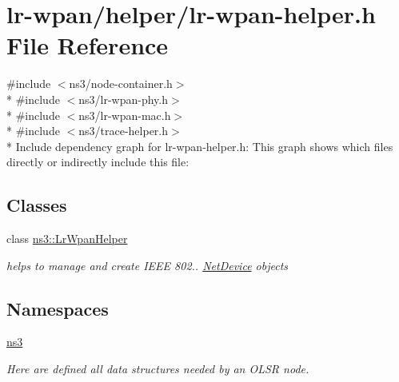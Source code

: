\hypertarget{lr-wpan-helper_8h}{}\section{lr-\/wpan/helper/lr-\/wpan-\/helper.h File Reference}
\label{lr-wpan-helper_8h}
{\ttfamily \#include $<$ns3/node-\/container.\+h$>$}\\*
{\ttfamily \#include $<$ns3/lr-\/wpan-\/phy.\+h$>$}\\*
{\ttfamily \#include $<$ns3/lr-\/wpan-\/mac.\+h$>$}\\*
{\ttfamily \#include $<$ns3/trace-\/helper.\+h$>$}\\*
Include dependency graph for lr-\/wpan-\/helper.h\+:
This graph shows which files directly or indirectly include this file\+:
\subsection*{Classes}
\begin{DoxyCompactItemize}
\item 
class \hyperlink{classns3_1_1LrWpanHelper}{ns3\+::\+Lr\+Wpan\+Helper}
\begin{DoxyCompactList}\small\item\em helps to manage and create I\+E\+EE 802.. \hyperlink{classns3_1_1NetDevice}{Net\+Device} objects \end{DoxyCompactList}\end{DoxyCompactItemize}
\subsection*{Namespaces}
\begin{DoxyCompactItemize}
\item 
 \hyperlink{namespacens3}{ns3}
\begin{DoxyCompactList}\small\item\em Here are defined all data structures needed by an O\+L\+SR node. \end{DoxyCompactList}\end{DoxyCompactItemize}
